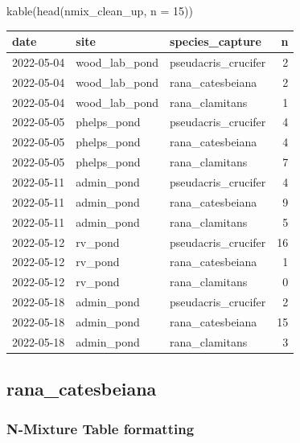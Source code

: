 \documentclass[
  letterpaper,
  DIV=11,
  numbers=noendperiod]{scrartcl}
\newenvironment{Shaded}{\begin{snugshade}}{\end{snugshade}}
\newcommand{\AttributeTok}[1]{\textcolor[rgb]{0.40,0.45,0.13}{#1}}
\newcommand{\DecValTok}[1]{\textcolor[rgb]{0.68,0.00,0.00}{#1}}
\newcommand{\FunctionTok}[1]{\textcolor[rgb]{0.28,0.35,0.67}{#1}}
\newcommand{\NormalTok}[1]{\textcolor[rgb]{0.00,0.23,0.31}{#1}}
\begin{document}
\begin{Shaded}
\begin{Highlighting}[]
\FunctionTok{kable}\NormalTok{(}\FunctionTok{head}\NormalTok{(nmix\_clean\_up, }\AttributeTok{n =} \DecValTok{15}\NormalTok{))}
\end{Highlighting}
\end{Shaded}

\begin{tabular}{l|l|l|r}
\hline
date & site & species\_capture & n\\
\hline
2022-05-04 & wood\_lab\_pond & pseudacris\_crucifer & 2\\
\hline
2022-05-04 & wood\_lab\_pond & rana\_catesbeiana & 2\\
\hline
2022-05-04 & wood\_lab\_pond & rana\_clamitans & 1\\
\hline
2022-05-05 & phelps\_pond & pseudacris\_crucifer & 4\\
\hline
2022-05-05 & phelps\_pond & rana\_catesbeiana & 4\\
\hline
2022-05-05 & phelps\_pond & rana\_clamitans & 7\\
\hline
2022-05-11 & admin\_pond & pseudacris\_crucifer & 4\\
\hline
2022-05-11 & admin\_pond & rana\_catesbeiana & 9\\
\hline
2022-05-11 & admin\_pond & rana\_clamitans & 5\\
\hline
2022-05-12 & rv\_pond & pseudacris\_crucifer & 16\\
\hline
2022-05-12 & rv\_pond & rana\_catesbeiana & 1\\
\hline
2022-05-12 & rv\_pond & rana\_clamitans & 0\\
\hline
2022-05-18 & admin\_pond & pseudacris\_crucifer & 2\\
\hline
2022-05-18 & admin\_pond & rana\_catesbeiana & 15\\
\hline
2022-05-18 & admin\_pond & rana\_clamitans & 3\\
\hline
\end{tabular}

\newpage

\hypertarget{rana_catesbeiana}{%
\subsection{rana\_catesbeiana}\label{rana_catesbeiana}}

\hypertarget{n-mixture-table-formatting}{%
\subsubsection{N-Mixture Table
formatting}\label{n-mixture-table-formatting}}
\end{document}
